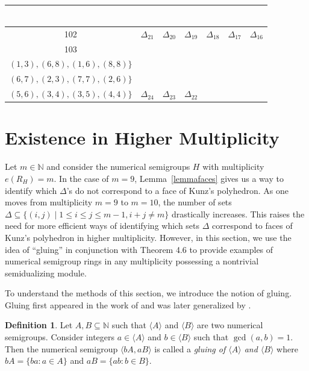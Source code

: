 \documentclass{amsart}
\theoremstyle{plain}
\theoremstyle{definition}
\newtheorem{definition}[theorem]{Definition}
\numberwithin{theorem}{section}
\numberwithin{equation}{section}
\numberwithin{equation}{theorem}
\begin{document}
{\begin{landscape}
\begin{longtable}{|c|c|c|c|c|c|c|}
\begin{tabular}{c}
\end{tabular}\\
\hline
102
&
$\Delta_{21}$
&
$\Delta_{20}$
&
$\Delta_{19}$
&
$\Delta_{18}$
&
$\Delta_{17}$
&
$\Delta_{16}$\\
\hline
103
&
\begin{tabular}{c}
$\Delta_{22}:=\{(1,1),(3,8),$\\
$(1,3),(6,8),(1,6),(8,8)\}$
\end{tabular}
&
\begin{tabular}{c}
$\Delta_{23}:=\{(3,7),(2,2),$\\
$(6,7),(2,3),(7,7),(2,6)\}$
\end{tabular}
&
\begin{tabular}{c}
$\Delta_{24}:=\{(4,6),(5,5),$\\
$(5,6),(3,4),(3,5),(4,4)\}$
\end{tabular}
&
$\Delta_{24}$
&
$\Delta_{23}$
&
$\Delta_{22}$
\\
\hline
\end{longtable}
\end{landscape}
}
\fi


\section{Existence in Higher Multiplicity}\label{section5}

Let $m\in \mathbb{N}$ and consider the numerical semigroups $H$ with multiplicity $e(R_H)=m$. 
In the case of $m=9$, Lemma~\ref{lemmafaces} gives us a way to identify which $\Delta$'s do not correspond to a face of Kunz’s polyhedron. 
As one moves from multiplicity $m=9$ to $m = 10$, the number of sets $\Delta \subseteq \{(i,j)\mid 1 \le i \le j \le m-1,i+j\not=m\}$ drastically increases. This raises the need for more efficient ways of identifying which sets $\Delta$ correspond to faces of Kunz’s polyhedron in higher multiplicity. However, in this section, we use the idea of ``gluing” in conjunction with Theorem 4.6 to provide examples of numerical semigroup rings in any multiplicity  possessing a nontrivial semidualizing module.

To understand the methods of this section, we introduce the notion of gluing. Gluing first appeared in the work of \cite{W73} and was later generalized by \cite{D76}.

\begin{definition}\label{def:gluing}
Let $A, B \subseteq \mathbb{N}$ such that $\langle A \rangle$ and $\langle B \rangle$ are two numerical semigroups. Consider integers $a \in \langle A \rangle$ and $b \in \langle B \rangle$ such that $\gcd(a,b) = 1$. Then the numerical semigroup $\langle b A, a B \rangle$ is called a \emph{gluing of $\langle A \rangle$ and $\langle B \rangle$} where $bA = \{ba: a \in A\}$ and $aB = \{ab: b \in B\}$.
\end{definition}
\end{document}
